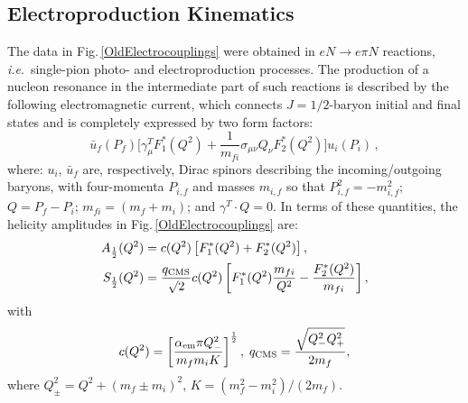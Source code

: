 \subsection{Electroproduction Kinematics}
%
The data in Fig.\,\ref{OldElectrocouplings} were obtained in $e N \to e \pi N$ reactions, \emph{i.e}.\ single-pion photo- and electroproduction processes.
%
The production of a nucleon resonance in the intermediate part of such reactions is described by the following electromagnetic current, which connects $J=1/2$-baryon initial and final states and is completely expressed by two form factors:
\begin{equation}
\bar u_{f}(P_f)\big[ \gamma_\mu^T F_{1}^{\ast}(Q^2)+\frac{1}{m_{{fi}}} \sigma_{\mu\nu} Q_\nu F_{2}^{\ast}(Q^2)\big] u_{i}(P_i)\,,
\label{NRcurrents}
\end{equation}
where: $u_{i}$, $\bar u_{f}$ are, respectively, Dirac spinors describing the incoming/outgoing baryons, with four-momenta $P_{i,f}$ and masses $m_{i,f}$ so that $P_{i,f}^2=-m_{i,f}^2$; $Q=P_f-P_i$; $m_{{fi}} = (m_f+m_{i})$; and $\gamma^T \cdot Q= 0$.
%
In terms of these quantities, the helicity amplitudes in Fig.\,\ref{OldElectrocouplings} are:
\begin{subequations}
\label{ThHelAmp}
\begin{align}
A_{\frac{1}{2}}(Q^2) & = c(Q^2) \left[ F_{1}^{\ast}(Q^2)+ F_{2}^{\ast}(Q^2) \right],\\
%
 S_{\frac{1}{2}}(Q^2) & =  \frac{q_{\rm CMS}}{\surd 2} c(Q^2)
\left[ F_{1}^{\ast}(Q^2) \frac{m_{fi}}{Q^2}  - \frac{F_{2}^{\ast}(Q^2)}{m_{fi}}  \right],
\end{align}
\end{subequations}
with
\begin{equation}
c(Q^2) = \left[ \frac{ \alpha_{\rm em} \pi  Q^2_-}{m_f m_i K} \right]^{\frac{1}{2}},\;
%
q_{\rm CMS} = \frac{\sqrt{Q_-^2 Q_+^2}}{2 m_f},
\end{equation}
where $Q_{\pm}^2 = Q^2 + (m_f \pm m_i)^2$, $K= (m_f^2-m_i^2)/(2 m_f)$.
%

